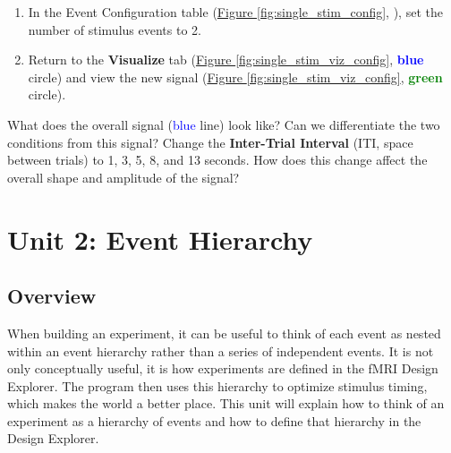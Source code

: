 \documentclass[10pt]{article}
\newcommand*\circled[1]{\tikz[baseline=(char.base)]{
            \node[shape=circle,draw,inner sep=.5pt] (char) {#1};}}
\begin{document}
\begin{enumerate}
\begin{enumerate}
				\item In the Event Configuration table (\hyperref[fig:single_stim_config]{Figure \ref{fig:single_stim_config}}, \circled{2}), set the number of stimulus events to 2.
				\item Return to the \textbf{Visualize} tab (\hyperref[fig:single_stim_viz_config]{Figure \ref{fig:single_stim_viz_config}}, \textcolor{blue}{\textbf{blue}} circle) and view the new signal (\hyperref[fig:single_stim_viz_config]{Figure \ref{fig:single_stim_viz_config}}, \textcolor{green}{\textbf{green}} circle).
			\end{enumerate} 
			What does the overall signal (\textcolor{blue}{blue} line) look like? Can we differentiate the two conditions from this signal? Change the \textbf{Inter-Trial Interval} (ITI, space between trials) to 1, 3, 5, 8, and 13 seconds. How does this change affect the overall shape and amplitude of the signal?
	 	\end{enumerate}
\newpage

\section{Unit 2: Event Hierarchy}
\label{sec:unit2}
	\subsection{Overview}
	\label{subsec:u2overview}
		When building an experiment, it can be useful to think of each event as nested within an event hierarchy rather than a series of independent events.
		It is not only conceptually useful, it is how experiments are defined in the fMRI Design Explorer.
		The program then uses this hierarchy to optimize stimulus timing, which makes the world a better place.
		This unit will explain how to think of an experiment as a hierarchy of events and how to define that hierarchy in the Design Explorer.
\end{document}
